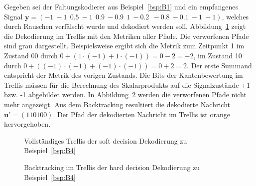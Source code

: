 \begin{beispiel}
Gegeben sei der Faltungskodierer aus Beispiel~\ref{bsp:B1} und ein empfangenes Signal $\mathbf{y}=\left( -1~-1~~0.5~-1~~0.9~-0.9~~1~-0.2~~-0.8~-0.1~-1~-1\right)$, welches durch Rauschen verfälscht wurde und dekodiert werden soll. Abbildung~\ref{abb:trellis_dek_soft_a} zeigt die Dekodierung im Trellis mit den Metriken aller Pfade. Die verworfenen Pfade sind grau dargestellt. Beispielsweise ergibt sich die Metrik zum Zeitpunkt 1 im Zustand 00 durch $0+\left( 1\cdot\left( -1\right) + 1\cdot\left( -1\right)\right) =0-2=-2$, im Zustand 10 durch $0+\left( \left( -1\right)\cdot\left( -1\right) + \left( -1\right)\cdot\left( -1\right)\right) =0+2=2$. Der erste Summand entspricht der Metrik des vorigen Zustands. Die Bits der Kantenbewertung im Trellis müssen für die Berechnung des Skalarprodukts auf die Signalzustände +1 bzw. -1 abgebildet werden. In Abbildung~\ref{abb:trellis_dek_soft_b} werden die verworfenen Pfade nicht mehr angezeigt. Aus dem Backtracking resultiert die dekodierte Nachricht $\mathbf{u'}=\left( 110100\right)$. Der Pfad der dekodierten Nachricht im Trellis ist orange hervorgehoben.
\label{bsp:B4}
\end{beispiel}

\begin{figure}[t]
	\centering
	\resizebox{0.70\textwidth}{!}{%
		
	}
	\caption{Vollständiges Trellis der soft decision Dekodierung zu Beispiel~\ref{bsp:B4}}
	\label{abb:trellis_dek_soft_a}
\end{figure}
\begin{figure}[t]
	\centering
	\resizebox{0.70\textwidth}{!}{%
		
	}
	\caption{Backtracking im Trellis der hard decision Dekodierung zu Beispiel~\ref{bsp:B4}}
	\label{abb:trellis_dek_soft_b}
\end{figure}

%				
%				

